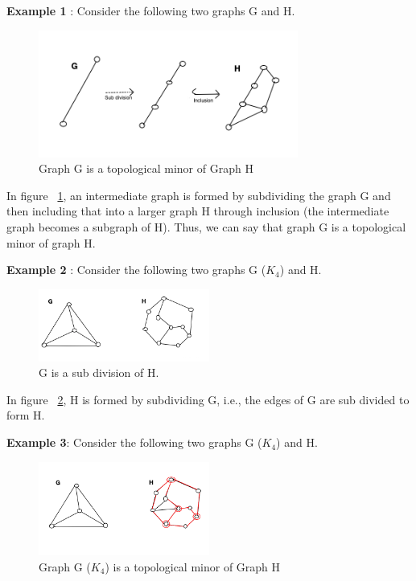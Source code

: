\documentclass{article}
\begin{document}
\textbf{Example 1} : Consider the following two graphs G and H.
\begin{figure}[!h]
    \centering
    \includegraphics[width=0.76\textwidth]{images/topMinorDef.png}
    \caption{Graph G is a topological minor of Graph H}
    \label{fig:topMinorDef}
\end{figure}


In figure ~\ref{fig:topMinorDef}, an intermediate graph is formed by subdividing the graph G and then including that into a larger graph H through inclusion (the intermediate graph becomes a subgraph of H). Thus, we can say that graph G is a topological minor of graph H.

\textbf{Example 2} : Consider the following two graphs G ($K_4$) and H. 

\begin{figure}[h]
    \centering
    \includegraphics[width=0.5\textwidth]{images/G_sub_K4.png}
    \caption{G is a sub division of H.}
    \label{fig:G_sub_K4}
\end{figure}

In figure ~\ref{fig:G_sub_K4}, H is formed by subdividing G, i.e., the edges of G are sub divided to form H.

\textbf{Example 3}: Consider the following two graphs G ($K_4$) and H.

\begin{figure}[!h]
    \centering
    \includegraphics[width=0.5\textwidth]{images/G_notSub_K4.png}
    \caption{Graph G ($K_4$) is a topological minor of Graph H}
    \label{fig:G_notSub_K4}
\end{figure}
\end{document}
